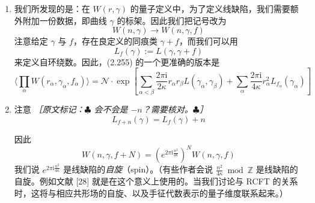 \begin{enumerate}
  \item 我们所发现的是：在 $W(r,\gamma)$ 的量子定义中，为了定义线缺陷，我们需要额外附加一份数据，即曲线 $\gamma$ 的标架。因此我们把记号改为
  \begin{equation}
    W(n,\gamma)\to W(n,\gamma,f)
    \tag{2.266}
    \label{eq:2.266}
  \end{equation}
  注意给定 $\gamma$ 与 $f$，存在良定义的同痕类 $\gamma+f$，而我们可以用
  \begin{equation}
    L_f(\gamma):=L(\gamma,\gamma+f)
    \tag{2.267}
    \label{eq:2.267}
  \end{equation}
  来定义自环绕数。因此，(2.255) 的一个更准确的版本是
  \begin{equation}
    \Big\langle\prod_{\alpha}W(r_{\alpha},\gamma_{\alpha},f_{\alpha})\Big\rangle
    =\mathcal{N}\cdot\exp\left[\sum_{\alpha<\beta}\frac{2\pi\mathrm{i}}{2\kappa}r_{\alpha}r_{\beta}L(\gamma_{\alpha},\gamma_{\beta})
    +\sum_{\alpha}\frac{2\pi\mathrm{i}}{4\kappa}r_{\alpha}^{2}L_{f_{\alpha}}(\gamma_{\alpha})\right]
    \tag{2.268}
    \label{eq:2.268}
  \end{equation}

  \item 注意
  {\small\itshape ［原文标记：\ensuremath{\clubsuit} 会不会是 $-n$？需要核对。\ensuremath{\clubsuit}］}
  \begin{equation}
    L_{f+n}(\gamma)=L_f(\gamma)+n
    \tag{2.269}
    \label{eq:2.269}
  \end{equation}

  因此
  \begin{equation}
    W(n,\gamma,f+N)=\left(e^{2\pi\mathrm{i}\frac{n^{2}}{4\kappa}}\right)^{N}W(n,\gamma,f)
    \tag{2.270}
    \label{eq:2.270}
  \end{equation}
  我们说 $e^{2\pi\mathrm{i}\frac{n^{2}}{4\kappa}}$ 是线缺陷的\emph{自旋}（spin）。（有些作者会说 $\frac{n^{2}}{4\kappa}\bmod\mathbb{Z}$ 是线缺陷的自旋。例如文献 [28] 就是在这个意义上使用的。当我们讨论与 RCFT 的关系时，这将与相应共形场的自旋、以及手征代数表示的量子维度联系起来。）


\end{enumerate}
